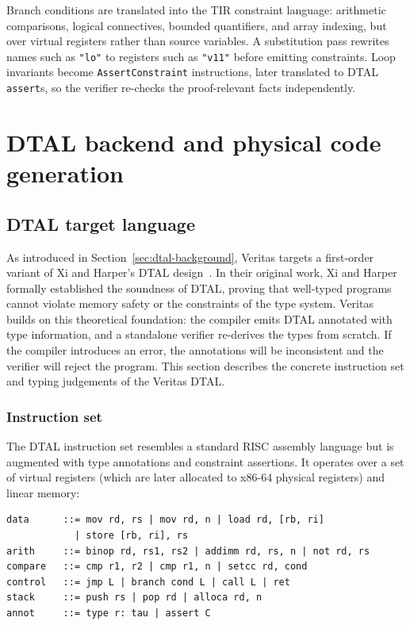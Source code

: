 Branch conditions are translated into the TIR constraint language: arithmetic comparisons, logical connectives, bounded quantifiers, and array indexing, but over virtual registers rather than source variables. A substitution pass rewrites names such as \texttt{"lo"} to registers such as \texttt{"v11"} before emitting constraints. Loop invariants become \texttt{AssertConstraint} instructions, later translated to DTAL \texttt{assert}s, so the verifier re-checks the proof-relevant facts independently.

\section{DTAL backend and physical code generation}\label{sec:backend}

\subsection{DTAL target language}\label{sec:dtal-target-lang}

As introduced in Section~\ref{sec:dtal-background}, Veritas targets a first-order variant of Xi and Harper's DTAL design~\cite{Xi2001DTAL}. In their original work, Xi and Harper formally established the soundness of DTAL, proving that well-typed programs cannot violate memory safety or the constraints of the type system. Veritas builds on this theoretical foundation: the compiler emits DTAL annotated with type information, and a standalone verifier re-derives the types from scratch. If the compiler introduces an error, the annotations will be inconsistent and the verifier will reject the program. This section describes the concrete instruction set and typing judgements of the Veritas DTAL.

\subsubsection{Instruction set}\label{sec:dtal-instr-set}

The DTAL instruction set resembles a standard RISC assembly language but is augmented with type annotations and constraint assertions. It operates over a set of virtual registers (which are later allocated to x86-64 physical registers) and linear memory:

\begin{verbatim}
data      ::= mov rd, rs | mov rd, n | load rd, [rb, ri]
            | store [rb, ri], rs
arith     ::= binop rd, rs1, rs2 | addimm rd, rs, n | not rd, rs
compare   ::= cmp r1, r2 | cmp r1, n | setcc rd, cond
control   ::= jmp L | branch cond L | call L | ret
stack     ::= push rs | pop rd | alloca rd, n
annot     ::= type r: tau | assert C
\end{verbatim}

